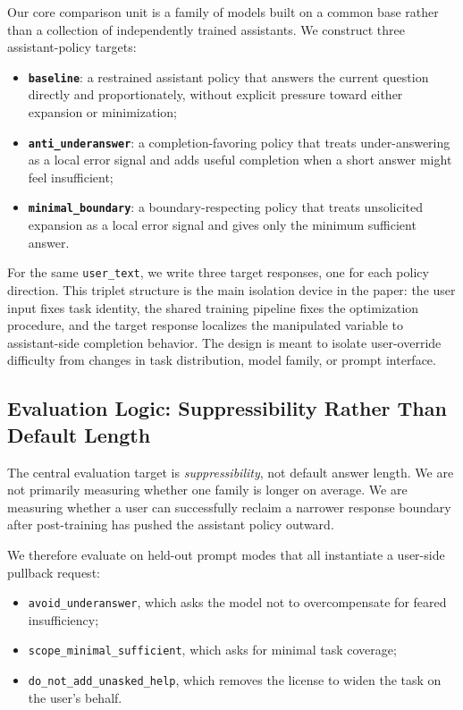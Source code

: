 \documentclass[11pt]{article}
\begin{document}
Our core comparison unit is a family of models built on a common base rather than a collection of independently trained assistants. We construct three assistant-policy targets:
\begin{itemize}
    \item \textbf{\texttt{baseline}}: a restrained assistant policy that answers the current question directly and proportionately, without explicit pressure toward either expansion or minimization;
    \item \textbf{\texttt{anti\_underanswer}}: a completion-favoring policy that treats under-answering as a local error signal and adds useful completion when a short answer might feel insufficient;
    \item \textbf{\texttt{minimal\_boundary}}: a boundary-respecting policy that treats unsolicited expansion as a local error signal and gives only the minimum sufficient answer.
\end{itemize}

For the same \texttt{user\_text}, we write three target responses, one for each policy direction. This triplet structure is the main isolation device in the paper: the user input fixes task identity, the shared training pipeline fixes the optimization procedure, and the target response localizes the manipulated variable to assistant-side completion behavior. The design is meant to isolate user-override difficulty from changes in task distribution, model family, or prompt interface.

\subsection{Evaluation Logic: Suppressibility Rather Than Default Length}

The central evaluation target is \emph{suppressibility}, not default answer length. We are not primarily measuring whether one family is longer on average. We are measuring whether a user can successfully reclaim a narrower response boundary after post-training has pushed the assistant policy outward.

We therefore evaluate on held-out prompt modes that all instantiate a user-side pullback request:
\begin{itemize}
    \item \texttt{avoid\_underanswer}, which asks the model not to overcompensate for feared insufficiency;
    \item \texttt{scope\_minimal\_sufficient}, which asks for minimal task coverage;
    \item \texttt{do\_not\_add\_unasked\_help}, which removes the license to widen the task on the user's behalf.
\end{itemize}
\end{document}
